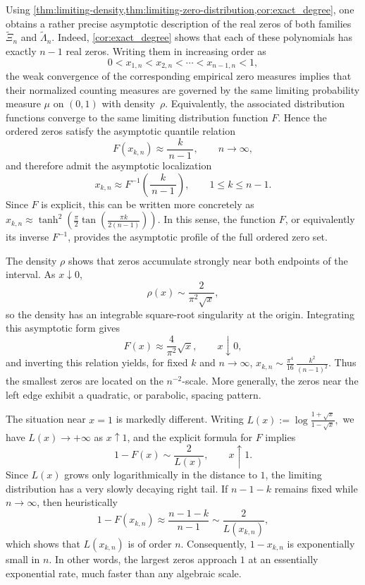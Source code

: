 \documentclass[11pt,twoside]{article}
\numberwithin{equation}{section}
\begin{document}
Using \cref{thm:limiting-density,thm:limiting-zero-distribution,cor:exact_degree}, one obtains a rather precise asymptotic description of the real zeros of both families \(\widetilde{\Xi}_n\) and \(\widetilde{\Lambda}_n\). Indeed, \cref{cor:exact_degree} shows that each of these polynomials has exactly \(n-1\) real zeros. Writing them in increasing order as
\[
0<x_{1,n}<x_{2,n}<\cdots<x_{n-1,n}<1,
\]
the weak convergence of the corresponding empirical zero measures implies that their normalized counting measures are governed by the same limiting probability measure \(\mu\) on \((0,1)\) with density~\(\rho\). Equivalently, the associated distribution functions converge to the same limiting distribution function \(F\). Hence the ordered zeros satisfy the asymptotic quantile relation
\[
F(x_{k,n})\approx \frac{k}{\,n-1\,},
\qquad n\to\infty,
\]
and therefore admit the asymptotic localization
\[
x_{k,n}\approx F^{-1}\!\left(\frac{k}{\,n-1\,}\right),
\qquad 1\le k\le n-1.
\]
Since \(F\) is explicit, this can be written more concretely as
\(\displaystyle
x_{k,n}\approx
\tanh^2\!\left(
\frac{\pi}{2}\tan\!\left(\frac{\pi k}{2(n-1)}\right)
\right).
\)
In this sense, the function \(F\), or equivalently its inverse \(F^{-1}\), provides the asymptotic profile of the full ordered zero set.

\vspace{0.2cm}

The density \(\rho\) shows that zeros accumulate strongly near both endpoints of the interval. As \(x\downarrow0\),
\[
\rho(x)\sim \frac{2}{\pi^2\sqrt{x}},
\]
so the density has an integrable square-root singularity at the origin. Integrating this asymptotic form gives
\[
F(x)\approx \frac{4}{\pi^2}\sqrt{x},
\qquad x\downarrow0,
\]
and inverting this relation yields, for fixed \(k\) and \(n\to\infty\),
\(\displaystyle
x_{k,n}\sim \frac{\pi^4}{16}\,\frac{k^2}{(n-1)^2}.
\)
Thus the smallest zeros are located on the \(n^{-2}\)-scale. More generally, the zeros near the left edge exhibit a quadratic, or parabolic, spacing pattern.

\vspace{0.2cm}

The situation near \(x=1\) is markedly different. Writing
\(\displaystyle
L(x):=\log\frac{1+\sqrt{x}}{1-\sqrt{x}},
\)
we have \(L(x)\to+\infty\) as \(x\uparrow1\), and the explicit formula for \(F\) implies
\[
1-F(x)\sim \frac{2}{L(x)},
\qquad x\uparrow1.
\]
Since \(L(x)\) grows only logarithmically in the distance to \(1\), the limiting distribution has a very slowly decaying right tail. If \(n-1-k\) remains fixed while \(n\to\infty\), then heuristically
\[
1-F(x_{k,n})\approx \frac{n-1-k}{\,n-1\,}\sim \frac{2}{L(x_{k,n})},
\]
which shows that \(L(x_{k,n})\) is of order \(n\). Consequently, \(1-x_{k,n}\) is exponentially small in \(n\). In other words, the largest zeros approach \(1\) at an essentially exponential rate, much faster than any algebraic scale.
\end{document}
